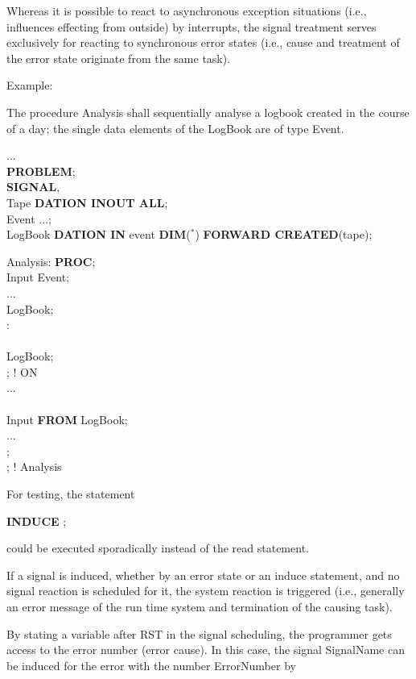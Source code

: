 Whereas it is possible to react to asynchronous exception situations
(i.e., influences effecting from outside) by interrupts, the signal
treatment serves exclusively for reacting to synchronous error states
(i.e., cause and treatment of the error state originate from the same
task).

Example:

The procedure Analysis shall sequentially analyse a logbook created
in the course of a day; the single data elements of the LogBook are of
type Event.

...\\
{\bf PROBLEM};\\
   {\bf SIGNAL},\\
\x \x Tape {\bf DATION INOUT ALL};\\
 Event ...;\\
 LogBook {\bf DATION IN} event {\bf DIM}($^*$) {\bf FORWARD CREATED}(tape);

Analysis: {\bf PROC};\\
 Input Event;\\
\x ...\\
 LogBook;\\
 :\\
\x {}\\
\x \x {} LogBook;\\
\x {}; ! ON \\
\x ...\\
\\
\x {} Input {\bf FROM} LogBook;\\
\x \x ...\\
;\\
; ! Analysis

For testing, the statement

{\bf INDUCE} ;

could be executed sporadically instead of the read statement.

If a signal is induced, whether by an error state or an induce
statement, and no signal reaction is scheduled for it, the system
reaction is triggered (i.e., generally an error message of the run time
system and termination of the causing task).

By stating a variable after RST in the signal scheduling, the programmer
gets access to the error number (error cause). In this case, the signal
SignalName can be induced for the error with the number ErrorNumber by

